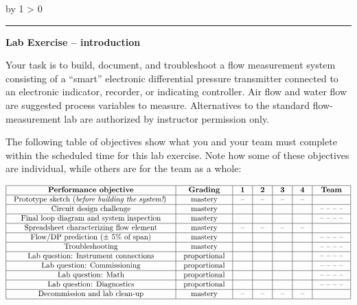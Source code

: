 \documentclass[12pt,a4paper]{article}
\def\oppgave{
            \advance\questnum by 1
            \ifnum \questnum > 0
                 \hrule
                 \vskip 3pt
                 \leftline{Oppgave \the\questnum}
                 \vskip 3pt \fi}
\begin{document}
\begin{itemize}

\vfil \eject 



\oppgave{} 

\noindent
{\bf Lab Exercise -- introduction}

\vskip 5pt

Your task is to build, document, and troubleshoot a flow measurement system consisting of a ``smart'' electronic differential pressure transmitter connected to an electronic indicator, recorder, or indicating controller.  Air flow and water flow are suggested process variables to measure.  Alternatives to the standard flow-measurement lab are authorized by instructor permission only.

The following table of objectives show what you and your team must complete within the scheduled time for this lab exercise.  Note how some of these objectives are individual, while others are for the team as a whole:



$$\vbox{\offinterlineskip
\halign{\strut
\vrule \quad\hfil # \ \hfil & 
\vrule \quad\hfil # \ \hfil & 
\vrule \quad\hfil # \ \hfil & 
\vrule \quad\hfil # \ \hfil & 
\vrule \quad\hfil # \ \hfil & 
\vrule \quad\hfil # \ \hfil & 
\vrule \quad\hfil # \ \hfil \vrule \cr
\noalign{\hrule}
%
{\bf Performance objective} & {\bf Grading} & {\bf 1} & {\bf 2} & {\bf 3} & {\bf 4} & {\bf Team} \cr
%
\noalign{\hrule}
%
Prototype sketch ({\it before building the system!}) & mastery & -- & -- & -- & -- & \cr
%
\noalign{\hrule}
%
Circuit design challenge & mastery & & & & & -- -- -- -- \cr
%
\noalign{\hrule}
%
Final loop diagram and system inspection & mastery & & & & & -- -- -- -- \cr
%
\noalign{\hrule}
%
Spreadsheet characterizing flow element & mastery & -- & -- & -- & -- &  \cr
%
\noalign{\hrule}
%
Flow/DP prediction ($\pm$ 5\% of span) & mastery & & & & & -- -- -- -- \cr
%
\noalign{\hrule}
%
Troubleshooting & mastery & & & & & -- -- -- -- \cr
%
\noalign{\hrule}
%
Lab question: Instrument connections & proportional &  &  &  &  & -- -- -- -- \cr
%
\noalign{\hrule}
%
Lab question: Commissioning & proportional &  &  &  &  & -- -- -- -- \cr
%
\noalign{\hrule}
%
Lab question: Math & proportional &  &  &  &  & -- -- -- -- \cr
%
\noalign{\hrule}
%
Lab question: Diagnostics & proportional &  &  &  &  & -- -- -- -- \cr
%
\noalign{\hrule}
%
Decommission and lab clean-up & mastery & -- & -- & -- & -- &  \cr
%
\noalign{\hrule}
} %
}$$ %


\end{itemize}
\end{document}
